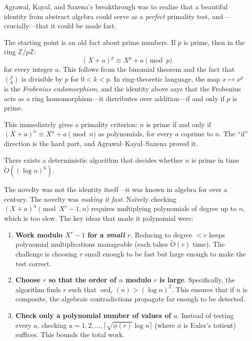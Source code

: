 Agrawal, Kayal, and Saxena's breakthrough was to realize that a beautiful identity from abstract algebra could serve as a \emph{perfect} primality test, and---crucially---that it could be made fast.

The starting point is an old fact about prime numbers. If $p$ is prime, then in the ring $\mathbb{Z}/p\mathbb{Z}$:
\[
(X + a)^p \equiv X^p + a \pmod{p}
\]
for every integer $a$. This follows from the binomial theorem and the fact that $\binom{p}{k}$ is divisible by $p$ for $0 < k < p$. In ring-theoretic language, the map $x \mapsto x^p$ is the \emph{Frobenius endomorphism}, and the identity above says that the Frobenius acts as a ring homomorphism---it distributes over addition---if and only if $p$ is prime.

This immediately gives a primality criterion: $n$ is prime if and only if $(X+a)^n \equiv X^n + a \pmod{n}$ as polynomials, for every $a$ coprime to $n$. The ``if'' direction is the hard part, and Agrawal--Kayal--Saxena proved it.

\begin{theorem}
There exists a deterministic algorithm that decides whether $n$ is prime in time $\tilde{O}((\log n)^6)$.
\end{theorem}

The novelty was not the identity itself---it was known in algebra for over a century. The novelty was \emph{making it fast}. Na\"ively checking $(X+a)^n \pmod{X^r - 1, n}$ requires multiplying polynomials of degree up to $n$, which is too slow. The key ideas that made it polynomial were:

\begin{enumerate}
\item \textbf{Work modulo $X^r - 1$ for a \emph{small} $r$}. Reducing to degree $< r$ keeps polynomial multiplications manageable (each takes $\tilde{O}(r)$ time). The challenge is choosing $r$ small enough to be fast but large enough to make the test correct.
\item \textbf{Choose $r$ so that the order of $n$ modulo $r$ is large}. Specifically, the algorithm finds $r$ such that $\operatorname{ord}_r(n) > (\log n)^2$. This ensures that if $n$ is composite, the algebraic contradictions propagate far enough to be detected.
\item \textbf{Check only a polynomial number of values of $a$}. Instead of testing every $a$, checking $a = 1, 2, \ldots, \lceil \sqrt{\phi(r)} \log n \rceil$ (where $\phi$ is Euler's totient) suffices. This bounds the total work.
\end{enumerate}

